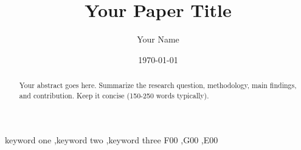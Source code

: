 %


\author[1]{Your Name}

\title{Your Paper Title}

\date{\today}

\newcommand*{\img}{img}


\begin{abstract}
\noindent
Your abstract goes here. Summarize the research question, methodology,
main findings, and contribution. Keep it concise (150-250 words typically).
\end{abstract}

\begin{keyword}
keyword one \sep keyword two \sep keyword three
\JEL F00 \sep G00 \sep E00
\end{keyword}

\maketitle

